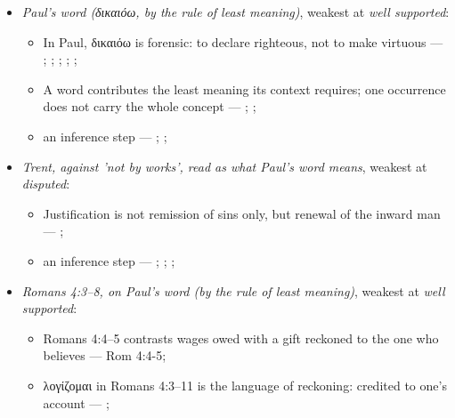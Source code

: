\documentclass[11pt]{article}
\begin{document}
\begin{itemize}
\begin{itemize}
\item an inference step --- \cite[XI.1]{westminster-confession-1647}; \cite[III.xi.2]{calvin-institutes-1960}; \cite{morris-apostolic-preaching-1965}
\end{itemize}
\item \emph{Paul's word (δικαιόω, by the rule of least meaning)}, weakest at \emph{well supported}:
\begin{itemize}
\item In Paul, δικαιόω is forensic: to declare righteous, not to make virtuous --- \cite[s.v. δικαιόω]{bauer-danker-lexicon-2000}; \cite{morris-apostolic-preaching-1965}; \cite[p. 80]{moo-romans-1996}; \cite{irons-righteousness-of-god-2015}; \cite{wright-justification-2009}; \cite[ad loc. Rom 3:24]{fitzmyer-romans-1993}
\item A word contributes the least meaning its context requires; one occurrence does not carry the whole concept --- \cite{silva-biblical-words-1994}; \cite{joos-semantic-axiom-1972}; \cite{barr-semantics-2004}
\item an inference step --- \cite{silva-biblical-words-1994}; \cite[p. 80]{moo-romans-1996}; \cite{barr-semantics-2004}
\end{itemize}
\item \emph{Trent, against 'not by works', read as what Paul's word means}, weakest at \emph{disputed}:
\begin{itemize}
\item Justification is not remission of sins only, but renewal of the inward man --- \cite[Trent, Session VI (1547), Decree on Justification, ch. 7]{tanner-decrees-1990}; \cite[Trent, Session VI (1547), canon 11]{tanner-decrees-1990}
\item an inference step --- \cite[Trent, Session VI (1547), Decree on Justification, ch. 8]{tanner-decrees-1990}; \cite[Trent, Session VI (1547), Decree on Justification, ch. 7]{tanner-decrees-1990}; \cite[On the Spirit and the Letter, ch. 45 (26.45)]{npnf1-05-1887}; \cite{mcgrath-iustitia-dei-2005}
\end{itemize}
\item \emph{Romans 4:3–8, on Paul's word (by the rule of least meaning)}, weakest at \emph{well supported}:
\begin{itemize}
\item Romans 4:4–5 contrasts wages owed with a gift reckoned to the one who believes --- Rom 4:4-5; \cite[III.xi.18]{calvin-institutes-1960}
\item λογίζομαι in Romans 4:3–11 is the language of reckoning: credited to one's account --- \cite[s.v. λογίζομαι]{bauer-danker-lexicon-2000}; \cite[ad loc. Rom 4:3]{moo-romans-1996}

\end{itemize}
\end{itemize}
\end{document}

